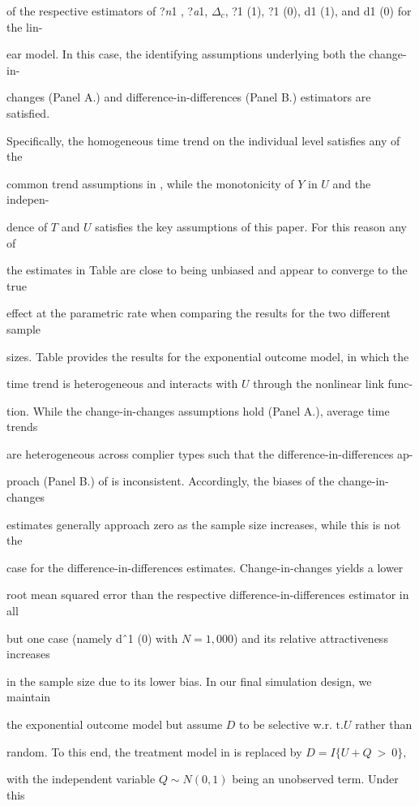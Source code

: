 \documentclass[a4paper,12pt]{article}
\begin{document}
of the respective estimators of ?{\it n}1 , ?{\it a}1, $\Delta_{c}$, ?1 (1), ?1 (0), d1 (1), and d1 (0) for the lin-

ear model. In this case, the identifying assumptions underlying both the change-in-

changes (Panel A.) and difference-in-differences (Panel B.) estimators are satisfied.

Specifically, the homogeneous time trend on the individual level satisfies any of the

common trend assumptions in , while the monotonicity of $Y$ in $U$ and the indepen-

dence of $T$ and $U$ satisfies the key assumptions of this paper. For this reason any of

the estimates in Table are close to being unbiased and appear to converge to the true

effect at the parametric rate when comparing the results for the two different sample

sizes. Table provides the results for the exponential outcome model, in which the

time trend is heterogeneous and interacts with $U$ through the nonlinear link func-

tion. While the change-in-changes assumptions hold (Panel A.), average time trends

are heterogeneous across complier types such that the difference-in-differences ap-

proach (Panel B.) of is inconsistent. Accordingly, the biases of the change-in-changes

estimates generally approach zero as the sample size increases, while this is not the

case for the difference-in-differences estimates. Change-in-changes yields a lower

root mean squared error than the respective difference-in-differences estimator in all

but one case (namely dˆ1 (0) with $N=1,000$) and its relative attractiveness increases

in the sample size due to its lower bias. In our final simulation design, we maintain

the exponential outcome model but assume $D$ to be selective w.r. $\mathrm{t}. U$ rather than

random. To this end, the treatment model in is replaced by $D = I\{U+Q\ >\ 0\},$

with the independent variable $Q\sim N(0,1)$ being an unobserved term. Under this
\end{document}
